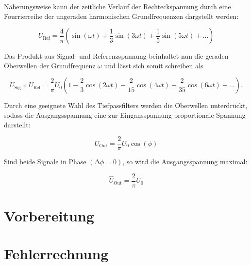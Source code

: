 \noindent Näherungsweise kann der zeitliche Verlauf der Rechteckspannung durch eine Fourrierreihe der ungeraden harmonischen
Grundfrequenzen dargstellt werden:

\begin{equation*}
    U_\text{Ref} = \frac{4}{\pi}\left(\sin(\omega t) + \frac{1}{3}\sin(3\omega t) + \frac{1}{5}\sin(5\omega t) + \dotsc\right)
\end{equation*}

\noindent Das Produkt aus Signal- und Referenzspannung beinhaltet nun die geraden Oberwellen der Grundfrequenz $\omega$ und lässt
sich somit schreiben als

\begin{equation*}
    U_\text{Sig} \times U_\text{Ref} = \frac{2}{\pi}U_0\left(1 - \frac{2}{3}\cos(2\omega t) - \frac{2}{15}\cos(4\omega t) - \frac{2}{35}\cos(6\omega t) + \dotsc\right).
\end{equation*}

Durch eine geeignete Wahl des Tiefpassfilters werden die Oberwellen unterdrückt, sodass die Ausgangsspannung eine zur Eingansspannung
proportionale Spannung darstellt:

\begin{equation*}
    U_\text{Out} = \frac{2}{\pi}U_0\cos(\phi)
\end{equation*}

\noindent Sind beide Signale in Phase $\left(\increment \phi = 0\right)$, so wird die Ausgangsspannung maximal:

\begin{equation*}
    \hat{U}_\text{Out} = \frac{2}{\pi}U_0
\end{equation*}

\section{Vorbereitung}

\section{Fehlerrechnung}
